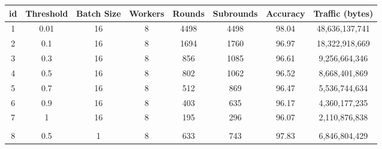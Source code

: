 \begin{table}[H]
    \begin{tabular}{|c|c|c|c|c|c|c|c|}
        \hline
        \textbf{id}            & \textbf{Threshold}    & \textbf{Batch Size}   & \textbf{Workers}      & \textbf{Rounds}       & \textbf{Subrounds}    & \textbf{Accuracy}     & \textbf{Traffic (bytes)} \\
        \hline
        1                      & 0.01                  & 16                    & 8                     & 4498                  & 4498                  & 98.04                 & 48,636,137,741           \\
        2                      & 0.1                   & 16                    & 8                     & 1694                  & 1760                  & 96.97                 & 18,322,918,669           \\
        3                      & 0.3                   & 16                    & 8                     & 856                   & 1085                  & 96.61                 & 9,256,664,346            \\
        4                      & 0.5                   & 16                    & 8                     & 802                   & 1062                  & 96.52                 & 8,668,401,869            \\
        5                      & 0.7                   & 16                    & 8                     & 512                   & 869                   & 96.47                 & 5,536,744,634            \\
        6                      & 0.9                   & 16                    & 8                     & 403                   & 635                   & 96.17                 & 4,360,177,235            \\
        7                      & 1                     & 16                    & 8                     & 195                   & 296                   & 96.07                 & 2,110,876,838            \\
        \hline
        \multicolumn{1}{|l|}{} & \multicolumn{1}{l|}{} & \multicolumn{1}{l|}{} & \multicolumn{1}{l|}{} & \multicolumn{1}{l|}{} & \multicolumn{1}{l|}{} & \multicolumn{1}{l|}{} & \multicolumn{1}{l|}{}    \\
        \hline
        8                      & 0.5                   & 1                     & 8                     & 633                   & 743                   & 97.83                 & 6,846,804,429            \\

\end{tabular}
\end{table}
